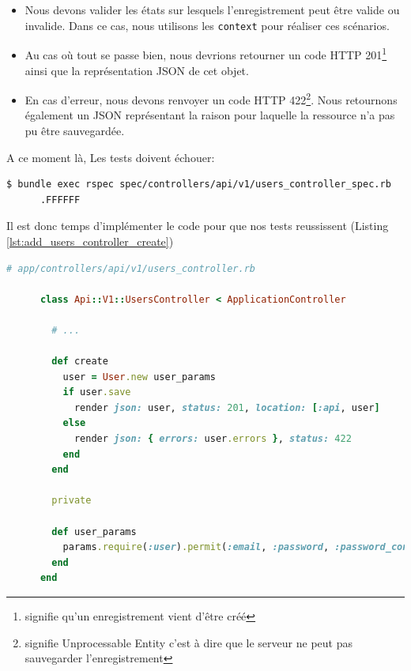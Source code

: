 \documentclass[]{report}
\begin{document}
      \begin{itemize}
        \item Nous devons valider les états sur lesquels l'enregistrement peut être valide ou invalide. Dans ce cas, nous utilisons les \verb|context| pour réaliser ces scénarios.
        \item  Au cas où tout se passe bien, nous devrions retourner un code HTTP 201\footnote{signifie qu'un enregistrement vient d'être créé} ainsi que la représentation JSON de cet objet.
        \item En cas d'erreur, nous devons renvoyer un code HTTP 422\footnote{signifie Unprocessable Entity c'est à dire que le serveur ne peut pas sauvegarder l'enregistrement}. Nous retournons également un JSON représentant la raison pour laquelle la ressource n'a pas pu être sauvegardée.
      \end{itemize}

      A ce moment là, Les tests doivent échouer:

      \begin{scriptsize}
      \begin{lstlisting}[language=bash]
      $ bundle exec rspec spec/controllers/api/v1/users_controller_spec.rb
      .FFFFFF
      \end{lstlisting}
      \end{scriptsize}

      Il est donc temps d'implémenter le code pour que nos tests reussissent (Listing \ref{lst:add_users_controller_create})

      \begin{scriptsize}
      \begin{lstlisting}[language=ruby, caption={Implémentation du contrôlleur utilisateurs afin que les tests de création passent}, label={lst:add_users_controller_create}]
      # app/controllers/api/v1/users_controller.rb

      class Api::V1::UsersController < ApplicationController

        # ...

        def create
          user = User.new user_params
          if user.save
            render json: user, status: 201, location: [:api, user]
          else
            render json: { errors: user.errors }, status: 422
          end
        end

        private

        def user_params
          params.require(:user).permit(:email, :password, :password_confirmation)
        end
      end
      \end{lstlisting}
      \end{scriptsize}
\end{document}
